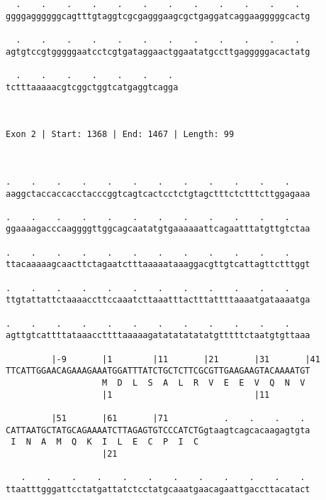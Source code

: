 \documentclass{article}
\begin{document}
\begin{Verbatim}
  .    .    .    .    .    .    .    .    .    .    .    .  
ggggaggggggcagtttgtaggtcgcgagggaagcgctgaggatcaggaagggggcactg
                                                            
  .    .    .    .    .    .    .    .    .    .    .    .  
agtgtccgtgggggaatcctcgtgataggaactggaatatgccttgagggggacactatg
                                                            
  .    .    .    .    .    .    . 
tctttaaaaacgtcggctggtcatgaggtcagga
                                  
                                  
 
Exon 2 | Start: 1368 | End: 1467 | Length: 99



.    .    .    .    .    .    .    .    .    .    .    .    
aaggctaccaccacctacccggtcagtcactcctctgtagctttctctttcttggagaaa
                                                            
.    .    .    .    .    .    .    .    .    .    .    .    
ggaaaagacccaaggggttggcagcaatatgtgaaaaaattcagaatttatgttgtctaa
                                                            
.    .    .    .    .    .    .    .    .    .    .    .    
ttacaaaaagcaacttctagaatctttaaaaataaaggacgttgtcattagttctttggt
                                                            
.    .    .    .    .    .    .    .    .    .    .    .    
ttgtattattctaaaaccttccaaatcttaaatttactttattttaaaatgataaaatga
                                                            
.    .    .    .    .    .    .    .    .    .    .    .    
agttgtcattttataaaccttttaaaaagatatatatatatgtttttctaatgtgttaaa
                                                            
         |-9       |1        |11       |21       |31       |41
TTCATTGGAACAGAAAGAAATGGATTTATCTGCTCTTCGCGTTGAAGAAGTACAAAATGT
                   M  D  L  S  A  L  R  V  E  E  V  Q  N  V 
                   |1                            |11        
  
         |51       |61       |71           .    .    .    . 
CATTAATGCTATGCAGAAAATCTTAGAGTGTCCCATCTGgtaagtcagcacaagagtgta
 I  N  A  M  Q  K  I  L  E  C  P  I  C                      
                   |21                                      
  
   .    .    .    .    .    .    .    .    .    .    .    . 
ttaatttgggattcctatgattatctcctatgcaaatgaacagaattgaccttacatact
                                                            

\end{Verbatim}
\end{document}
